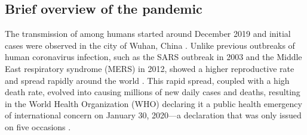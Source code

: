 




\subsection{Brief overview of the pandemic}

The transmission of \sars among humans started around December 2019 and initial cases were observed in the city of Wuhan, China \citep{bergeri2022EarlyEpidemiological}.
Unlike previous outbreaks of human coronavirus infection, such as the SARS outbreak in 2003 and the Middle East respiratory syndrome (MERS) in 2012, \covid showed a higher reproductive rate and spread rapidly around the world \citep{liu2020ReproductiveNumber}.
This rapid spread, coupled with a high death rate, evolved into causing millions of new daily cases and deaths, resulting in the World Health Organization (WHO) declaring it a public health emergency of international concern on January 30, 2020---a declaration that was only issued on five occasions \citep{wilder-smith2020PublicHealth}.


